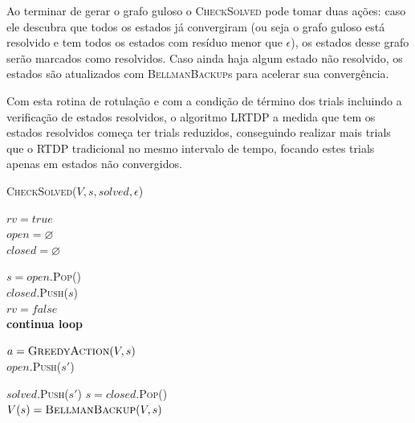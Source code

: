 \documentclass[letterpaper]{article}
\begin{document}
Ao terminar de gerar o grafo guloso o \textsc{CheckSolved} pode tomar duas ações: caso ele descubra que todos os estados já convergiram (ou seja o grafo guloso está resolvido e tem todos os estados com resíduo menor que $\epsilon$), os estados desse grafo serão marcados como resolvidos. Caso ainda haja algum estado não resolvido, os estados são atualizados com \textsc{BellmanBackup}s para acelerar sua convergência.

Com esta rotina de rotulação e com a condição de término dos trials incluindo a verificação de estados resolvidos, o algoritmo LRTDP a medida que tem os estados resolvidos começa ter trials reduzidos, conseguindo realizar mais trials que o RTDP tradicional no mesmo intervalo de tempo, focando estes trials apenas em estados não  convergidos.

\linesnumbered
\begin{algorithm}[t]
{
	\caption{\textsc{CheckSolved}($ V, s, \textit{solved}, \epsilon $) }
	\label{alg:checksolved}
    $ \textit{rv} = true $\\
    $ \textit{open} = \varnothing $\\
    $ \textit{closed} = \varnothing $\\

    {
        $s = \textit{open}$.\textsc{Pop}() \\
        $\textit{closed}$.\textsc{Push}($s$) \\

        {
            $ \textit{rv} = false $\\
            \textbf{continua loop}
        }

        $a = \textsc{GreedyAction}(V, s)$ \\

        {
            {
                $\textit{open}$.\textsc{Push}($s'$)
            }
        }
    }

    {
        {
            $\textit{solved}$.\textsc{Push}($s'$)
        }
    }
    {
        {
            $ s = \textit{closed}$.\textsc{Pop}()\\
            $V(s) = \textsc{BellmanBackup}(V, s)$ \\
        }
    }

}
\end{algorithm}
\end{document}
